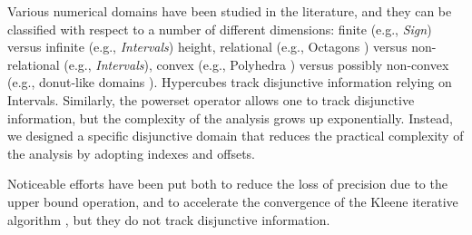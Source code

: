 Various numerical domains have been studied in the literature, and they can be classified with respect to a number of different dimensions: finite (e.g., \textit{Sign}) versus infinite (e.g., \textit{Intervals}) height, relational (e.g., Octagons \cite{MIN06}) versus non-relational (e.g., \textit{Intervals}), convex (e.g., Polyhedra \cite{CH78}) versus possibly non-convex (e.g., donut-like domains \cite{G12}). Hypercubes track disjunctive information relying on Intervals. Similarly, the powerset operator \cite{FR99} allows one to track disjunctive information, but the complexity of the analysis grows up exponentially. Instead, we designed a specific disjunctive domain that reduces the practical complexity of the analysis by adopting indexes and offsets. 

%

Noticeable efforts have been put both to reduce the loss of precision due to the upper bound operation, and to accelerate the convergence of the Kleene iterative algorithm \cite{HMG06,SB13,SISG06,BHZ07}, but they do not track disjunctive information.


